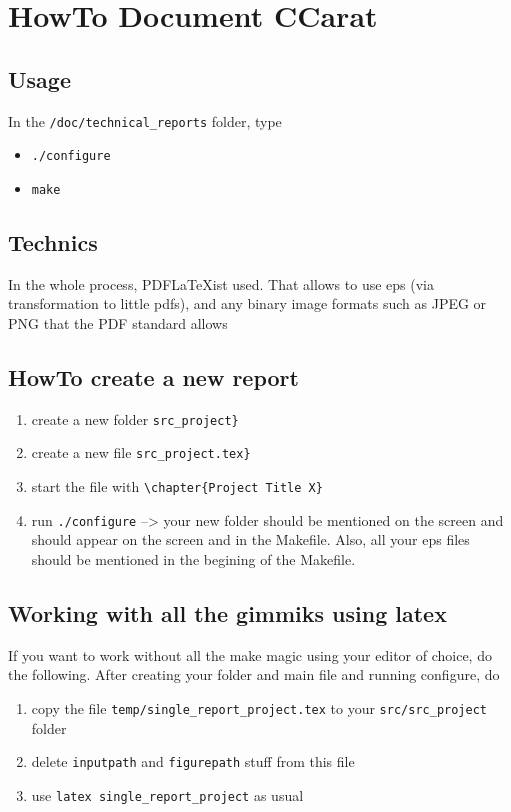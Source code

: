 \chapter{HowTo Document CCarat} 

\newcommand{\test}[1]{\vec{#1}}

\section{Usage}

In the \verb|/doc/technical_reports| folder, type
\begin{itemize}
\item \verb|./configure|
\item \verb|make|
\end{itemize}

\section{Technics}

In the whole process, PDF\LaTeX ist used. That allows to use eps (via transformation to little pdfs), and any binary image formats such as JPEG or PNG that the PDF standard allows

\section{HowTo create a new report}

\begin{enumerate}
  \item create a new folder \verb|src_project}|
  \item create a new file \verb|src_project.tex}|
  \item start the file with \verb|\chapter{Project Title X}|
  \item run \verb|./configure| --> your new folder should be mentioned on the screen and should appear on the screen and in the Makefile. Also, all your eps files should be mentioned in the begining of the Makefile.
\end{enumerate}


\section{Working with all the gimmiks using latex}
If you want to work without all the make magic using your editor of choice, do the following.
After creating your folder and main file and running configure, do
\begin{enumerate}
 \item copy the file \verb|temp/single_report_project.tex| to your \verb|src/src_project| folder
 \item delete \verb|inputpath| and \verb|figurepath| stuff from this file
 \item use \verb|latex single_report_project| as usual
\end{enumerate}

